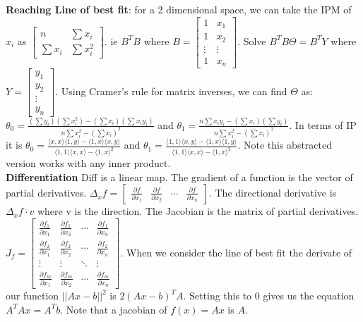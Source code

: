 \documentclass[answers,12pt,addpoints]{exam}
\begin{document}
\textbf{Reaching Line of best fit}: for a 2 dimensional space, we can take the IPM of $x_i$ as $\begin{bmatrix}
    n & \sum x_i \\
    \sum x_i & \sum x_i^2
\end{bmatrix}$. ie $B^T B$ where $B = \begin{bmatrix}
    1 & x_1 \\
    1 & x_2 \\
    \vdots & \vdots \\
    1 & x_n
\end{bmatrix}$. Solve $B^T B \Theta = B^T Y$ where $Y = \begin{bmatrix}
    y_1 \\
    y_2 \\
    \vdots \\
    y_n
\end{bmatrix}$. Using Cramer's rule for matrix inverses, we can find $\Theta$ as:
$\theta_0 = \frac{(\sum y_i )(\sum x^2_i) - (\sum x_i)(\sum x_i y_i)}{n\sum x_i^2 - (\sum x_i)^2} $
and $\theta_1 = \frac{n\sum x_i y_i - (\sum x_i)(\sum y_i)}{n\sum x_i^2 - (\sum x_i)^2}$. In terms of IP it is $\theta_0 = \frac{\langle x,x \rangle \langle 1, y \rangle - \langle 1,x\rangle\langle x,y\rangle}{\langle 1,1 \rangle \langle x,x \rangle - \langle 1,x\rangle^2}$
and $\theta_1 = \frac{\langle 1,1 \rangle \langle x,y \rangle - \langle 1,x\rangle\langle 1,y\rangle}{\langle 1,1 \rangle \langle x,x \rangle - \langle 1,x\rangle^2}$. Note this abstracted version works with any inner product.\\

\textbf{Differentiation} Diff is a linear map. The gradient of a function is the vector of partial derivatives. $\Delta_x f = \begin{bmatrix}
    \frac{\partial f}{\partial x_1} &
    \frac{\partial f}{\partial x_2} &
    \cdots &
    \frac{\partial f}{\partial x_n}
\end{bmatrix}$. The directional derivative is $\Delta_x f \cdot v$ where v is the direction. The Jacobian is the matrix of partial derivatives. $J_f = \begin{bmatrix}
    \frac{\partial f_1}{\partial x_1} & \frac{\partial f_1}{\partial x_2} & \cdots & \frac{\partial f_1}{\partial x_n} \\
    \frac{\partial f_2}{\partial x_1} & \frac{\partial f_2}{\partial x_2} & \cdots & \frac{\partial f_2}{\partial x_n} \\
    \vdots & \vdots & \ddots & \vdots \\
    \frac{\partial f_m}{\partial x_1} & \frac{\partial f_m}{\partial x_2} & \cdots & \frac{\partial f_m}{\partial x_n}
\end{bmatrix}$. When we consider the line of best fit the derivate of our function $||Ax - b||^2$ is $2(Ax - b)^T A$. Setting this to 0 gives us the equation $A^T Ax = A^Tb$. Note that a jacobian of $f(x) = Ax$ is $A$.\\
\end{document}
